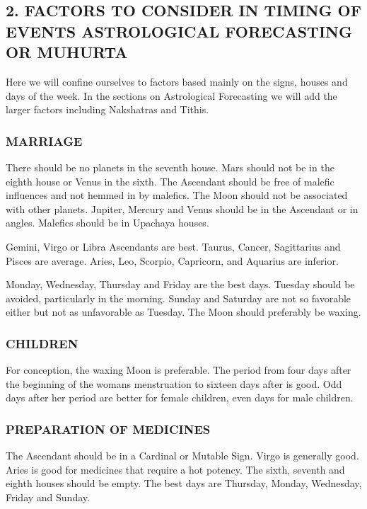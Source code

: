 \subsection{2. FACTORS TO CONSIDER IN TIMING OF EVENTS
ASTROLOGICAL FORECASTING OR MUHURTA}
 

Here we will confine ourselves to factors based mainly on the signs, houses and days of the week. In the sections on Astrological Forecasting we will add the larger factors including Nakshatras and Tithis.

 

\subsubsection{MARRIAGE}

There should be no planets in the seventh house. Mars should not be in the eighth house or Venus in the sixth. The Ascendant should be free of malefic influences and not hemmed in by malefics. The Moon should not be associated with other planets. Jupiter, Mercury and Venus should be in the Ascendant or in angles. Malefics should be in Upachaya houses.

 

Gemini, Virgo or Libra Ascendants are best. Taurus, Cancer, Sagittarius and Pisces are average. Aries, Leo, Scorpio, Capricorn, and Aquarius are inferior.

 

Monday, Wednesday, Thursday and Friday are the best days. Tuesday should be avoided, particularly in the morning. Sunday and Saturday are not so favorable either but not as unfavorable as Tuesday. The Moon should preferably be waxing.

 

\subsubsection{CHILDREN}

For conception, the waxing Moon is preferable. The period from four days after the beginning of the womans menstruation to sixteen days after is good. Odd days after her period are better for female children, even days for male children.

 

\subsubsection{PREPARATION OF MEDICINES}

The Ascendant should be in a Cardinal or Mutable Sign. Virgo is generally good. Aries is good for medicines that require a hot potency. The sixth, seventh and eighth houses should be empty. The best days are Thursday, Monday, Wednesday, Friday and Sunday.


